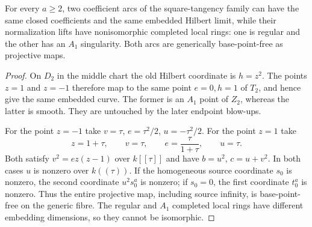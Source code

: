 \begin{corollary}
\label{cor:tangent-lost-labels-v171}
For every $a\geq2$, two coefficient arcs of the square-tangency family
can have the same closed coefficients and the same embedded Hilbert
limit, while their normalization lifts have nonisomorphic completed
local rings: one is regular and the other has an $A_1$ singularity.
Both arcs are generically base-point-free as projective maps.
\end{corollary}
\begin{proof}
On $D_2$ in the middle chart the old Hilbert coordinate is $h=z^2$.
The points $z=1$ and $z=-1$ therefore map to the same point $e=0,h=1$
of $T_2$, and hence give the same embedded curve. The former is an
$A_1$ point of $Z_2$, whereas the latter is smooth. They are untouched
by the later endpoint blow-ups.

For the point $z=-1$ take $v=\tau$, $e=\tau^2/2$, $u=-\tau^2/2$.
For the point $z=1$ take
\[
 z=1+\tau,\qquad v=\tau,\qquad
 e=\frac{\tau}{1+\tau},\qquad u=\tau.
\]
Both satisfy $v^2=ez(z-1)$ over $k[[\tau]]$ and have
$b=u^2$, $c=u+v^2$. In both cases $u$ is nonzero over $k((\tau))$.
If the homogeneous source coordinate $s_0$ is nonzero, the second
coordinate $u^2s_0^a$ is nonzero; if $s_0=0$, the first coordinate
$t_0^a$ is nonzero. Thus the entire projective map, including source
infinity, is base-point-free on the generic fibre. The regular and
$A_1$ completed local rings have different embedding dimensions, so
they cannot be isomorphic.
\end{proof}
